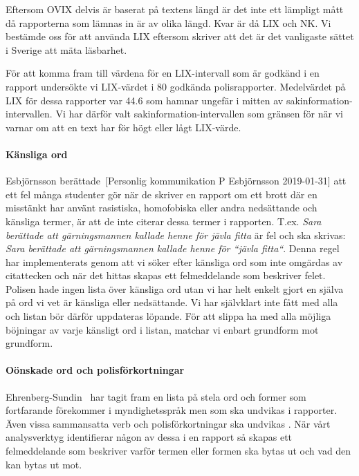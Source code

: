\documentclass[swedish]{maucsthesis}
\begin{document}
Eftersom OVIX delvis är baserat på textens längd är det inte ett lämpligt mått då
rapporterna som lämnas in är av olika längd. Kvar är då LIX och NK. Vi bestämde
oss för att använda LIX eftersom \cite{abrahamsson:2011} skriver att det är det
vanligaste sättet i Sverige att mäta läsbarhet.

För att komma fram till värdena för en LIX-intervall som är godkänd i en rapport
undersökte vi LIX-värdet i 80 godkända polisrapporter. Medelvärdet på LIX för
dessa rapporter var 44.6 som hamnar ungefär i mitten av sakinformation-intervallen. Vi har därför valt sakinformation-intervallen som gränsen för när
vi varnar om att en text har för högt eller lågt LIX-värde.

\paragraph*{Känsliga ord}

Esbjörnsson berättade~[Personlig kommunikation P Esbjörnsson 2019-01-31] att
ett fel många studenter gör när de skriver en rapport om ett brott där en misstänkt
har använt rasistiska, homofobiska eller andra nedsättande och känsliga termer, är att 
de inte citerar dessa termer i rapporten. T.ex. \textit{Sara berättade att gärningsmannen kallade henne för jävla fitta} är fel och ska skrivas: \textit{Sara berättade att gärningsmannen kallade henne för ``jävla fitta``}. Denna regel har implementerats
genom att vi söker efter känsliga ord som inte omgärdas av citattecken och när det hittas skapas ett felmeddelande som beskriver felet.
Polisen hade ingen lista över känsliga ord utan vi har helt enkelt gjort en själva
på ord vi vet är känsliga eller nedsättande. Vi har självklart inte fått med alla 
och listan bör därför uppdateras löpande. För att slippa ha med alla möjliga böjningar
av varje känsligt ord i listan, matchar vi enbart grundform mot grundform.

\paragraph*{Oönskade ord och polisförkortningar}

Ehrenberg-Sundin~\cite{sundin:1992} har tagit fram en lista på stela ord och former som 
fortfarande förekommer i myndighetsspråk men som ska undvikas i rapporter. 
Även vissa sammansatta verb och polisförkortningar ska undvikas \cite{rfsip}.
När vårt analysverktyg identifierar någon av dessa i en rapport så skapas ett felmeddelande
som beskriver varför termen eller formen ska bytas ut och vad den kan bytas ut mot.
\end{document}
